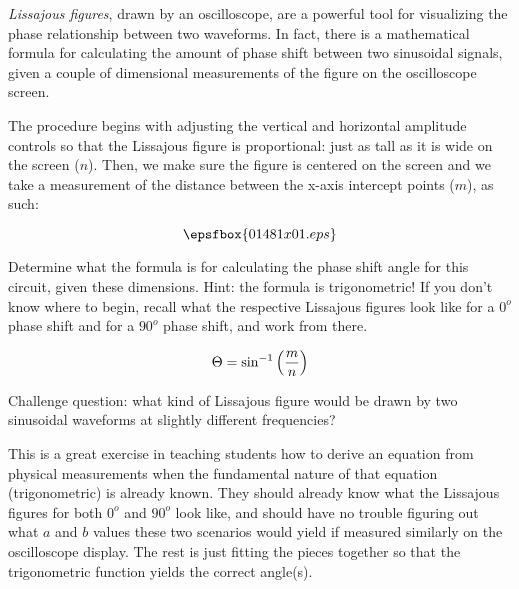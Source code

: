 

{\it Lissajous figures}, drawn by an oscilloscope, are a powerful tool for visualizing the phase relationship between two waveforms.  In fact, there is a mathematical formula for calculating the amount of phase shift between two sinusoidal signals, given a couple of dimensional measurements of the figure on the oscilloscope screen.

The procedure begins with adjusting the vertical and horizontal amplitude controls so that the Lissajous figure is proportional: just as tall as it is wide on the screen ($n$).  Then, we make sure the figure is centered on the screen and we take a measurement of the distance between the x-axis intercept points ($m$), as such:

$$\epsfbox{01481x01.eps}$$

Determine what the formula is for calculating the phase shift angle for this circuit, given these dimensions.  Hint: the formula is trigonometric!  If you don't know where to begin, recall what the respective Lissajous figures look like for a $0^o$ phase shift and for a $90^o$ phase shift, and work from there.







$$\Theta = \sin^{-1} \left({m \over n}\right)$$

\vskip 10pt

Challenge question: what kind of Lissajous figure would be drawn by two sinusoidal waveforms at slightly different frequencies?







This is a great exercise in teaching students how to derive an equation from physical measurements when the fundamental nature of that equation (trigonometric) is already known.  They should already know what the Lissajous figures for both $0^o$ and $90^o$ look like, and should have no trouble figuring out what $a$ and $b$ values these two scenarios would yield if measured similarly on the oscilloscope display.  The rest is just fitting the pieces together so that the trigonometric function yields the correct angle(s).




